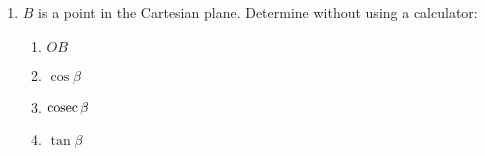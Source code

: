 \begin{exercises}{}
{
  \begin{enumerate}[itemsep=5pt, label=\textbf{\arabic*}. ]
   \item $B$ is a point in the Cartesian plane. Determine without using a calculator:
\begin{enumerate}[noitemsep, label=\textbf{(\alph*)} ]
 \item $OB$
\item $\cos \beta$
\item $\operatorname{cosec} \beta$
\item $\tan \beta$
\end{enumerate}



\end{enumerate}}
\end{exercises}
